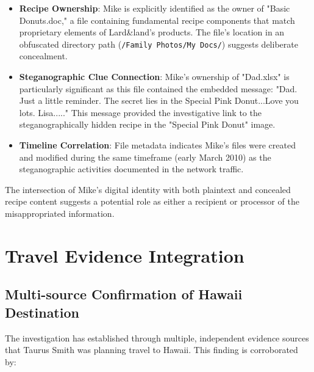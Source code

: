 \begin{itemize}
    \item \textbf{Recipe Ownership}: Mike is explicitly identified as the owner of "Basic Donuts.doc," a file containing fundamental recipe components that match proprietary elements of Lard\&land's products. The file's location in an obfuscated directory path (\texttt{/Family Photos/My Docs/}) suggests deliberate concealment.
    
    \item \textbf{Steganographic Clue Connection}: Mike's ownership of "Dad.xlsx" is particularly significant as this file contained the embedded message: "Dad. Just a little reminder. The secret lies in the Special Pink Donut...Love you lots. Lisa....." This message provided the investigative link to the steganographically hidden recipe in the "Special Pink Donut" image.
    
    \item \textbf{Timeline Correlation}: File metadata indicates Mike's files were created and modified during the same timeframe (early March 2010) as the steganographic activities documented in the network traffic.
\end{itemize}

The intersection of Mike's digital identity with both plaintext and concealed recipe content suggests a potential role as either a recipient or processor of the misappropriated information.

\section{Travel Evidence Integration}
\subsection{Multi-source Confirmation of Hawaii Destination}
The investigation has established through multiple, independent evidence sources that Taurus Smith was planning travel to Hawaii. This finding is corroborated by:

